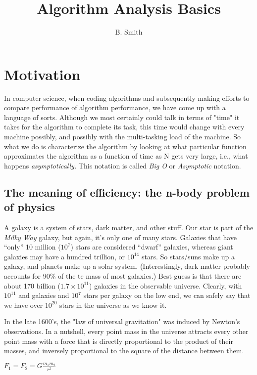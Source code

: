 \documentclass[14pt]{article} %
\title{Algorithm Analysis Basics}
\author{B. Smith}
\begin{document}
\maketitle

\section{Motivation}

In computer science, when coding algorithms and subsequently making efforts to compare performance of algorithm performance, we have come up with a language of sorts.  Although we most certainly could talk in terms of "time" it takes for the algorithm to complete its task, this time would change with every machine possibly, and possibly with the multi-tasking load of the machine.  So what we do is characterize the algorithm by looking at what particular function approximates the algorithm as a function of time as N gets very large, i.e., what happens \textit{asymptotically.} This notation is called \textit{Big O} or \textit{Asymptotic} notation.


\subsection{The meaning of efficiency: the n-body problem of physics }

A galaxy is a system of stars, dark matter, and other stuff. Our star is part of the \textit{Milky Way} galaxy, but again, it's only one of many stars.  Galaxies  that have ``only'' 10 million ($10^7$) stars are considered ``dwarf'' galaxies, whereas giant galaxies may have a hundred trillion,  or $10^{14}$ stars.  So stars/suns make up a galaxy, and planets make up a solar system.  (Interestingly, dark matter probably accounts for 90\% of the te mass of most galaxies.)  Best guess is that there are about 170 billion  ($1.7 \times 10^{11}$) galaxies in the observable universe.  Clearly, with $10^{11}$ and galaxies and $10^7$ stars per galaxy on the low end, we can safely say that we have over $10^{20}$ stars in the universe as we know it.     

In the late 1600's, the "law of universal gravitation" was induced by Newton's observations.  In a nutshell, every point mass in the universe attracts every other point mass with a force that is directly proportional to the product of their masses, and inversely proportional to the square of the distance between them.


\begin{center}
$F_1 = F_2 = G \frac{m_1 m_2}{r^2}$
\end{center}
\end{document}
